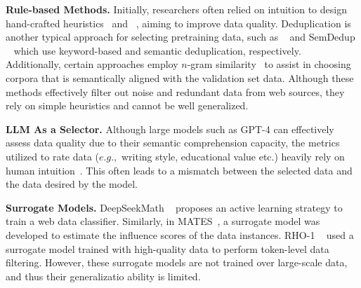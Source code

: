 \documentclass{article} %
\begin{document}
\textbf{Rule-based Methods.}
Initially, researchers often relied on intuition to design hand-crafted heuristics~\citep{soldaini2024dolma} and ~\citep{penedo2023refinedweb}, aiming to improve data quality. Deduplication is another typical approach for selecting pretraining data, such as ~\citep{penedo2023refinedweb} and SemDedup ~\citep{abbas2023semdedup} which use keyword-based and semantic deduplication, respectively. Additionally, certain approaches employ $n$-gram similarity~\citep{gao2020pile, xie2023data} to assist in choosing corpora that is semantically aligned with the validation set data.
Although these methods effectively filter out noise and redundant data from web sources, they rely on simple heuristics and cannot be well generalized.

\textbf{LLM As a Selector.}
Although large models such as GPT-4 can effectively assess data quality due to their semantic comprehension capacity, the metrics utilized to rate data ($e.g.,$ writing style, educational value etc.) heavily rely on human intuition~\citep{wettig2024qurating, penedo2024fineweb, zhang2024autonomous, gunasekar2023textbooks}. This often leads to a mismatch between the selected data and the data desired by the model. 



\textbf{Surrogate Models.}
DeepSeekMath ~\citep{shao2024deepseekmath} proposes an active learning strategy to train a web data classifier. Similarly, in MATES~\citep{yu2024mates}, a surrogate model was developed to estimate the influence scores of the data instances. RHO-1 ~\citep{lin2024rho} used a surrogate model trained with high-quality data to perform token-level data filtering. 
However, these surrogate models are not trained over large-scale data, and thus their generalizatio ability is limited.

\end{document}
